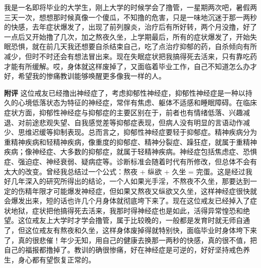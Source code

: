\begin{case}
    我是一名即将毕业的大学生，刚上大学的时候学会了撸管，一星期两次吧，暑假两三天一次，想想那时候真像一个傻瓜，不知撸的危害，只是一味地沉迷于那一两秒的快感，去年症状爆发了，出现了前列腺炎，治疗后有所好转，两个月没撸，好了一点后又开始撸了几次，加之熬夜久坐，上学期最后，所有的症状爆发了，开始失眠恐惧，就在前几天我还想要自杀结束自己，吃了点治疗抑郁的药，自杀倾向有所减少，但时不时还会有想法冒出来。现在失眠症状把我搞得死去活来，只有靠吃药才能有所缓解。哎，身体就这样废掉了，又面临着毕业工作，自己不知道怎么办才好，希望我的惨痛教训能够唤醒更多像我一样的人。

    \textbf{附评} 这位戒友已经撸出神经症了，考虑抑郁性神经症，抑郁性神经症是一种以持久的心境低落状态为特征的神经症，常伴有焦虑、躯体不适感和睡眠障碍。在临床症状方面，抑郁性神经症与抑郁症的主要区别在于，前者也有情绪低落、兴趣减退、对前途悲观失望、自我感觉差等抑郁症表现，但病人没有明显的言语动作减少、思维迟缓等抑制表现。总而言之，抑郁性神经症要轻于抑郁症。精神疾病分为重精神疾病和轻精神疾病，像重度的抑郁症、精神分裂症、躁狂症，就属于重精神疾病；像神经症、大多数的抑郁症，就属于轻精神疾病。神经症包括焦虑症、恐惧症、强迫症、神经衰弱、疑病症等。诊断标准会随着时代有所修改，但总体不会有太大的改变。曾经我总结过一个公式：熬夜 + 纵欲 + 久坐 = 完蛋。这是经过我好几年深入的研究所得出的结论，一个人如果光手淫，不熬夜不久坐，那要达到一定的伤精年限才可能爆发神经症，但如果又熬夜又纵欲又久坐，这样神经症很快就会爆发出来，短的话也许几个月身体就彻底垮下来了。现在这位戒友已经掉入了症状地狱，症状把他搞得死去活来，我那时得神经症也是如此，活得异常惶恐和绝望。这位戒友上大学时才学会撸管，属于比较晚的，一般都是发育时就无师自通了，但这位戒友有熬夜和久坐，这样身体废掉得就特别快，面临毕业时身体垮下来了，真的很悲催！年少无知，用自己的健康去换那一两秒的快感，真的很不值，把自己的福报都撸掉了。教训的确很惨痛，好在神经症是可逆的，好好坚持戒色养生，身心都有望恢复正常的。
\end{case}

